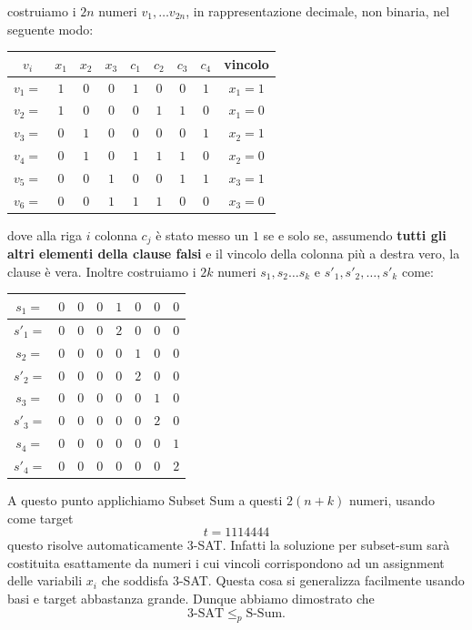 \documentclass[11pt]{scrartcl}
\begin{document}
	costruiamo i $2n$ numeri $v_1,\dots v_{2n}$, in rappresentazione decimale, non binaria, nel seguente modo:
	\begin{center}
		\begin{tabular}{| c | c | c | c || c | c | c | c | c |}
			\hline
			$v_i$ & $x_1$ & $x_2$ & $x_3$ & $c_1$ & $c_2$ & $c_3$ & $c_4$ & vincolo\\
			\hline
			$v_1=$ & $1$ & $0$ & $0$ & $1$ & $0$ & $0$ & $1$ & $x_1=1$\\
			\hline
			$v_2=$ & $1$ & $0$ & $0$ & $0$ & $1$ & $1$ & $0$ & $x_1=0$\\
			\hline
			$v_3=$ & $0$ & $1$ & $0$ & $0$ & $0$ & $0$ & $1$ & $x_2=1$\\
			\hline
			$v_4=$ & $0$ & $1$ & $0$ & $1$ & $1$ & $1$ & $0$ & $x_2=0$\\
			\hline
			$v_5=$ & $0$ & $0$ & $1$ & $0$ & $0$ & $1$ & $1$ & $x_3=1$\\
			\hline
			$v_6=$ & $0$ & $0$ & $1$ & $1$ & $1$ & $0$ & $0$ & $x_3=0$\\
 			\hline
		\end{tabular}
	\end{center}
	dove alla riga $i$ colonna $c_j$ è stato messo un $1$ se e solo se, assumendo \textbf{tutti gli altri elementi della clause falsi} e il vincolo della colonna più a destra vero, la clause è vera. Inoltre costruiamo i $2k$ numeri $s_1,s_2\dots s_k$ e $s'_1,s'_2,\dots,s'_k$ come:
	\begin{center}
		\begin{tabular}{| c | c | c | c | c | c | c | c | }
			\hline
			$s_1=$ 	& $0$ & $0$ & $0$ & $1$ & $0$ & $0$ & $0$ \\
			\hline
			$s'_1=$ & $0$ & $0$ & $0$ & $2$ & $0$ & $0$ & $0$ \\
			\hline
			$s_2=$ 	& $0$ & $0$ & $0$ & $0$ & $1$ & $0$ & $0$ \\
			\hline
			$s'_2=$ & $0$ & $0$ & $0$ & $0$ & $2$ & $0$ & $0$ \\
			\hline
			$s_3=$ 	& $0$ & $0$ & $0$ & $0$ & $0$ & $1$ & $0$ \\
			\hline
			$s'_3=$ & $0$ & $0$ & $0$ & $0$ & $0$ & $2$ & $0$ \\
			\hline
			$s_4=$ 	& $0$ & $0$ & $0$ & $0$ & $0$ & $0$ & $1$ \\
			\hline
			$s'_4=$ & $0$ & $0$ & $0$ & $0$ & $0$ & $0$ & $2$ \\
			\hline
		\end{tabular}
	\end{center}
	A questo punto applichiamo Subset Sum a questi $2(n+k)$ numeri, usando come target
	$$t=1114444$$
	questo risolve automaticamente $3$-SAT. Infatti la soluzione per subset-sum sarà costituita esattamente da numeri i cui vincoli corrispondono ad un assignment delle variabili $x_i$ che soddisfa $3$-SAT. Questa cosa si generalizza facilmente usando basi e target abbastanza grande. Dunque abbiamo dimostrato che
	$$3\text{-SAT}\le_p \text{S-Sum}.$$
	
\end{document}
